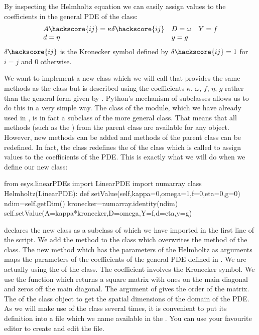 By inspecting the Helmholtz equation  
we can easily assign values to the coefficients in the 
general PDE of the \LinearPDE class:
\begin{equation}\label{DIFFUSION HELM EQ 3}
\begin{array}{llllll}
A\hackscore{ij}=\kappa \delta\hackscore{ij} & D=\omega & Y=f \\
d=\eta & y= g &  \\
\end{array}
\end{equation}
$\delta\hackscore{ij}$ is the Kronecker symbol  defined by $\delta\hackscore{ij}=1$ for
$i=j$ and $0$ otherwise.

We want to implement a 
new class which we will call  that provides the same methods as the \LinearPDE class but
is described using the coefficients $\kappa$, $\omega$, $f$, $\eta$, 
$g$ rather than the general form given by . 
Python's mechanism of subclasses allows us to do this in a very simple way.
The \Poisson class of the \linearPDEs module,
which we have already used in , is in fact a subclass of the more general
\LinearPDE class. That means that all methods (such as the )
from the parent class \LinearPDE are available for any \Poisson object. However, new
methods can be added and methods of the parent class can be redefined. In fact,
the \Poisson class redefines the  of the \LinearPDE class which is called to assign 
values to the coefficients of the PDE. This is exactly what we will do when we define 
our new  class:
\begin{python}
from esys.linearPDEs import LinearPDE
import numarray
class Helmholtz(LinearPDE):
   def setValue(self,kappa=0,omega=1,f=0,eta=0,g=0)
        ndim=self.getDim()
        kronecker=numarray.identity(ndim)
        self.setValue(A=kappa*kronecker,D=omega,Y=f,d=eta,y=g)
\end{python}
 declares the new  class as a subclass 
of \LinearPDE which we have imported in the first line of the script. 
We add the method  to the class which overwrites the 
 method of the \LinearPDE class. The new method which has the 
parameters of the Helmholtz  as arguments 
maps the parameters of the coefficients of the general PDE defined 
in . We are actually using the  of 
the \LinearPDE class. 
The coefficient  involves the Kronecker symbol. We use the
\numarray function  which returns a square matrix with ones on the
main diagonal and zeros off the main diagonal. The argument of  gives the order of the matrix.
The  of the \LinearPDE class object  to get the spatial dimensions of the domain of the
PDE. As we will make use of the  class several times, it is convenient to 
put its definition into a file which we name  available in the \ExampleDirectory.
You can use your favourite editor to create and edit the file.   

